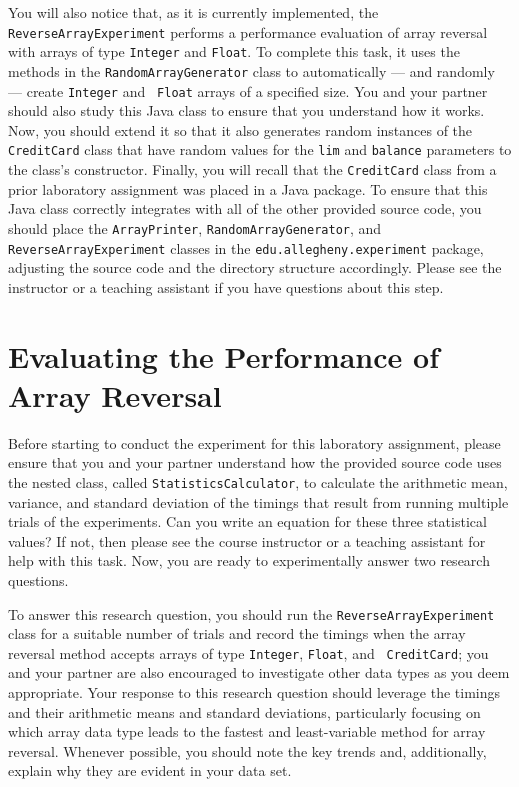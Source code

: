 You will also notice that, as it is currently implemented, the {\tt ReverseArrayExperiment} performs a performance
evaluation of array reversal with arrays of type {\tt Integer} and {\tt Float}. To complete this task, it uses the
methods in the {\tt RandomArrayGenerator} class to automatically --- and randomly --- create {\tt Integer} and {\tt
Float} arrays of a specified size. You and your partner should also study this Java class to ensure that you understand
how it works. Now, you should extend it so that it also generates random instances of the {\tt CreditCard} class that
have random values for the {\tt lim} and {\tt balance} parameters to the class's constructor. Finally, you will recall
that the {\tt CreditCard} class from a prior laboratory assignment was placed in a Java package. To ensure that this
Java class correctly integrates with all of the other provided source code, you should place the {\tt ArrayPrinter},
{\tt RandomArrayGenerator}, and {\tt ReverseArrayExperiment} classes in the {\tt edu.allegheny.experiment} package,
adjusting the source code and the directory structure accordingly. Please see the instructor or a teaching assistant if
you have questions about this step.

\section*{Evaluating the Performance of Array Reversal}

Before starting to conduct the experiment for this laboratory assignment, please ensure that you and your partner
understand how the provided source code uses the nested class, called {\tt StatisticsCalculator}, to calculate the
arithmetic mean, variance, and standard deviation of the timings that result from running multiple trials of the
experiments. Can you write an equation for these three statistical values? If not, then please see the course instructor
or a teaching assistant for help with this task. Now, you are ready to experimentally answer two research questions.

 To
answer this research question, you should run the {\tt ReverseArrayExperiment} class for a suitable number of trials and
record the timings when the array reversal method accepts arrays of type {\tt Integer}, {\tt Float}, and {\tt
CreditCard}; you and your partner are also encouraged to investigate other data types as you deem appropriate. Your
response to this research question should leverage the timings and their arithmetic means and standard deviations,
particularly focusing on which array data type leads to the fastest and least-variable method for array reversal.
Whenever possible, you should note the key trends and, additionally, explain why they are evident in your data set.

